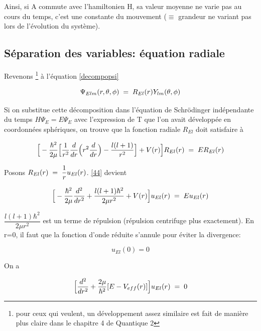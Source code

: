 \vspace{0.2cm}

Ainsi, si A commute avec l'hamiltonien H, sa valeur moyenne ne varie pas au cours du temps, c'est une constante du mouvement ($\equiv$ grandeur ne variant pas lors de l'évolution du système). 

\subsection{Séparation des variables: équation radiale} 

Revenons \footnote{pour ceux qui veulent, un développement assez similaire est fait de 
manière plus claire dans le chapitre 4 de Quantique 2} à l'équation \eqref{decompopsi}

\begin{equation*}
    \Psi_{Elm}(r, \theta, \phi)\; = \; R_{El}(r)Y_{lm}(\theta, \phi)
\end{equation*}

Si on substitue cette décomposition dans l'équation de Schrödinger indépendante du temps $H\Psi_E=E\Psi_E$ avec l'expression de T que l'on avait développée en coordonnées sphériques, on trouve que la fonction radiale $R_{El}$ doit satisfaire à

\begin{equation}
    \Big[-\dfrac{\hbar^2}{2\mu}\Big[\dfrac{1}{r^2}\dfrac{d}{dr}\Big(r^2\dfrac{d}{dr}\Big) - \dfrac{l(l+1)}{r^2}\Big]+V(r)\Big]R_{El}(r)\; = \; ER_{El}(r)
    \label{44}
\end{equation}

\vspace{0.2cm}

Posons $R_{El}(r)\; = \; \dfrac{1}{r}u_{El}(r)$. \eqref{44} devient

\begin{equation*}
    \Big[-\dfrac{\hbar^2}{2\mu}\dfrac{d^2}{dr^2}+\dfrac{l(l+1)\hbar^2}{2 \mu r^2}+V(r)\Big] u_{El}(r)\; = \; Eu_{El}(r)
\end{equation*}
\vspace{0.2cm}

$\dfrac{l(l+1)\hbar^2}{2\mu r^2}$ est un terme de répulsion (répulsion centrifuge plus exactement). En r=0, il faut que la fonction d'onde réduite s'annule pour éviter la divergence:

$$u_{El}(0)=0$$

\vspace{0.2cm}  

On a

\begin{equation}
    \Big[\dfrac{d^2}{dr^2}+\dfrac{2\mu}{\hbar^2}[E-V_{eff}(r)]\Big]u_{El}(r)\; = \; 0
    \label{jsp}
\end{equation}

